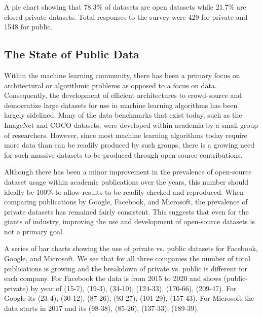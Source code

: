 {{{{           
    
    A pie chart showing that 78.3\% of datasets are open datasets while 21.7\% are closed private datasets. Total responses to the survey were 429 for private and 1548 for public.
    
    \subsection{The State of Public Data}
    
    Within the machine learning community, there has been a primary focus on architectural or algorithmic problems as opposed to a focus on data. Consequently, the development of efficient architectures to crowd-source and democratize large datasets for use in machine learning algorithms has been largely sidelined. Many of the data benchmarks that exist today, such as the ImageNet and COCO datasets, were developed within academia by a small group of researchers. However, since most machine learning algorithms today require more data than can be readily produced by such groups, there is a growing need for such massive datasets to be produced through open-source contributions.
    
    Although there has been a minor improvement in the prevalence of open-source dataset usage within academic publications over the years, this number should ideally be 100\% to allow results to be readily checked and reproduced. When comparing publications by Google, Facebook, and Microsoft, the prevalence of private datasets has remained fairly consistent. This suggests that even for the giants of industry, improving the use and development of open-source datasets is not a primary goal.
    
    
    A series of bar charts showing the use of private vs. public datasets for Facebook, Google, and Microsoft. We see that for all three companies the number of total publications is growing and the breakdown of private vs. public is different for each company. For Facebook the data is from 2015 to 2020 and shows (public-private) by year of (15-7), (19-3), (34-10), (124-33), (170-66), (209-47). For Google its (23-4), (30-12), (87-26), (93-27), (101-29), (157-43). For Microsoft the data starts in 2017 and its (98-38), (85-26), (137-33), (189-39).
    
}}}}
